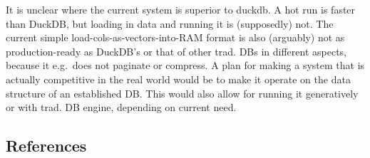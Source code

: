 \documentclass[
]{article}
\begin{document}
It is unclear where the current system is superior to duckdb. A hot run
is faster than DuckDB, but loading in data and running it is
(supposedly) not. The current simple load-cols-as-vectors-into-RAM
format is also (arguably) not as production-ready as DuckDB's or that of
other trad. DBs in different aspects, because it e.g.~does not paginate
or compress. A plan for making a system that is actually competitive in
the real world would be to make it operate on the data structure of an
established DB. This would also allow for running it generatively or
with trad. DB engine, depending on current need.

\subsection{References}\label{references}
\end{document}
